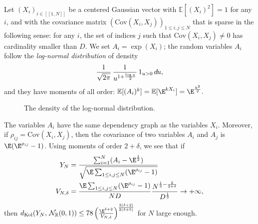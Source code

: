 \documentclass[envcountsame]{svmult}
\newcommand{\R}{\mathbb{R}}
\newcommand{\esper}{\mathbb{E}}
\newcommand{\dkol}{d_\mathrm{Kol}}
\newcommand{\cov}{\mathrm{Cov}}
\newcommand{\gauss}{\mathcal{N}_{\R}(0,1)}
\newcommand{\lle}{\left[\!\left[}
\newcommand{\rre}{\right]\!\right]}
\newcommand{\DD}[1]{\,d\hspace*{-0.3mm}{#1}}
\begin{document}
\begin{example}
Let $(X_i)_{i \in \lle 1,N\rre}$ be a centered Gaussian vector with $\esper[(X_i)^2]=1$ for any $i$, and with the covariance matrix $(\cov(X_i,X_j))_{1\leq i,j \leq N}$ that is sparse in the following sense: for any $i$, the set of indices $j$ such that $\cov(X_i,X_j) \neq 0$ has cardinality smaller than $D$. We set $A_i=\exp(X_i)$; the random variables $A_i$ follow the \emph{log-normal distribution} of density
$$\frac{1}{\sqrt{2\pi}}\,\frac{1}{u^{1+\frac{\log u}{2}}}\,1_{u>0}\DD{u}, $$
and they have moments of all order:
$\esper[(A_i)^{k}] = \esper[\E^{kX_i}] = \E^{\frac{k^2}{2}}.$
\begin{figure}[ht]
\begin{center}
\end{center}
\caption{The density of the log-normal distribution.}
\end{figure}

The variables $A_i$ have the same dependency graph as the variables $X_i$. Moreover, if $\rho_{ij}=\cov(X_i,X_j)$, then the covariance of two variables $A_i$ and $A_j$ is $\E(\E^{\rho_{ij}}-1)$. Using moments of order $2+\delta$, we see that if
\begin{align*}
Y_N &= \frac{\sum_{i=1}^N (A_i-\E^{\frac{1}{2}})}{\sqrt{\E \sum_{1\leq i,j\leq N} (\E^{\rho_{ij}}-1)}}\\ 
V_{N,\delta} &= \frac{\E\sum_{1\leq i,j\leq N} (\E^{\rho_{ij}}-1)}{ND} \frac{N^{\frac{1}{3}- \frac{2}{2+\delta} }}{D^{\frac{1}{3}}}\to +\infty,
\end{align*}
then $\dkol(Y_N,\,\gauss)\leq 78\left(\frac{\E^{\delta+2}}{V_{N,\delta}}\right)^{\frac{3(\delta+2)}{2(\delta+5)}}$ for $N$ large enough.\medskip


\end{example}
\end{document}
